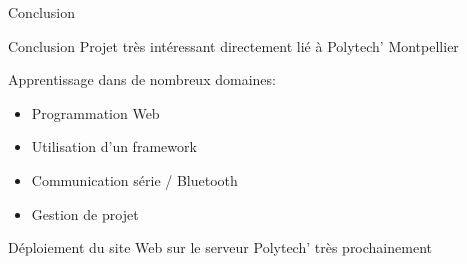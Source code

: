 \begin{frame}{Conclusion}
    \begin{block}{Conclusion}
        Projet très intéressant directement lié à Polytech' Montpellier

        Apprentissage dans de nombreux domaines:
        \begin{itemize}
        \item Programmation Web
        \item Utilisation d'un framework
        \item Communication série / Bluetooth
        \item Gestion de projet
        \end{itemize}

		Déploiement du site Web sur le serveur Polytech' très prochainement
	\end{block}	
\end{frame}
